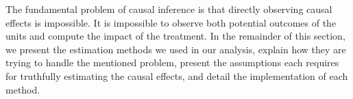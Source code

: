 \documentclass{article}
\newcommand{\gur}[1]{{\color{teal}{Gur: #1}}}
\begin{document}
The fundamental problem of causal inference is that directly observing causal effects is impossible. It is impossible to observe both potential outcomes of the units and compute the impact of the treatment. In the remainder of this section, we present the estimation methods we used in our analysis, explain how they are trying to handle the mentioned problem, present the assumptions each requires for truthfully estimating the causal effects, and detail the implementation of each method.







\end{document}
